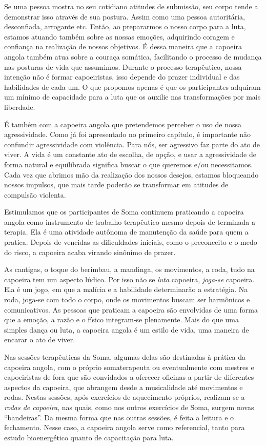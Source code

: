 Se uma pessoa mostra no seu cotidiano atitudes de submissão, seu corpo
tende a demonstrar isso através de sua postura. Assim como uma pessoa
autoritária, desconfiada, arrogante etc. Então, ao prepararmos o nosso
corpo para a luta, estamos atuando também sobre as nossas emoções,
adquirindo coragem e confiança na realização de nossos objetivos. É
dessa maneira que a capoeira angola também atua sobre a couraça
somática, facilitando o processo de mudança nas posturas de vida que
assumimos. Durante o processo terapêutico, nossa intenção não é formar
capoeiristas, isso depende do prazer individual e das habilidades de
cada um. O que propomos apenas é que os participantes adquiram um mínimo
de capacidade para a luta que os auxilie nas transformações por mais
liberdade.

É também com a capoeira angola que pretendemos perceber o uso de nossa
agressividade. Como já foi apresentado no primeiro capítulo, é
importante não confundir agressividade com violência. Para nós, ser
agressivo faz parte do ato de viver. A vida é um constante ato de
escolha, de opção, e usar a agressividade de forma natural e equilibrada
significa buscar o que queremos e/ou necessitamos. Cada vez que abrimos
mão da realização dos nossos desejos, estamos bloqueando nossos
impulsos, que mais tarde poderão se transformar em atitudes de compulsão
violenta.

Estimulamos que os participantes de Soma continuem praticando a capoeira
angola como instrumento de trabalho terapêutico mesmo depois de
terminada a terapia. Ela é uma atividade autônoma de manutenção da saúde
para quem a pratica. Depois de vencidas as dificuldades iniciais, como o
preconceito e o medo do risco, a capoeira acaba virando sinônimo de
prazer.

As cantigas, o toque do berimbau, a mandinga, os movimentos, a roda,
tudo na capoeira tem um aspecto lúdico. Por isso não se \emph{luta}
capoeira, \emph{joga-se} capoeira. Ela é um jogo, em que a malícia e a
habilidade determinarão a estratégia. Na roda, joga-se com todo o corpo,
onde os movimentos buscam ser harmônicos e comunicativos. As pessoas que
praticam a capoeira são envolvidas de uma forma que a emoção, a razão e
o físico integram-se plenamente. Mais do que uma simples dança ou luta,
a capoeira angola é um estilo de vida, uma maneira de encarar o ato de
viver.

Nas sessões terapêuticas da Soma, algumas delas são destinadas à prática
da capoeira angola, com o próprio somaterapeuta ou eventualmente com
mestres e capoeiristas de fora que são convidados a oferecer oficinas a
partir de diferentes aspectos da capoeira, que abrangem desde a
musicalidade até movimentos e rodas. Nestas sessões, após exercícios de
aquecimento próprios, realizam-se a \emph{rodas de capoeira}, nas quais,
como nos outros exercícios de Soma, surgem novas ``bandeiras''. Da mesma
forma que nas outras sessões, é feita a leitura e o fechamento. Nesse
caso, a capoeira angola serve como referencial, tanto para estudo
bioenergético quanto de capacitação para luta.

